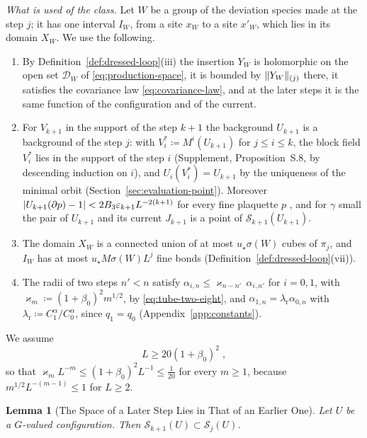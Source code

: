 \documentclass[11pt]{preprint}
\DeclarePairedDelimiter{\abs}{\lvert}{\rvert}
\DeclarePairedDelimiter{\norm}{\lVert}{\rVert}
\numberwithin{equation}{section}
\newtheorem{lemma}[theorem]{Lemma}
\theoremstyle{definition}
\theoremstyle{remark}
\theoremstyle{plain}
\begin{document}
\emph{What is used of the class.} Let $W$ be a group of the deviation species made at the step $j$; it has one interval $I_W$, from a site $x_W$ to a site $x'_W$, which lies in its domain $X_W$. We use the following.
\begin{enumerate}[label=(\alph*)]
\item By Definition~\ref{def:dressed-loop}(iii) the insertion $Y_W$ is holomorphic on the open set $\mathcal D_W$ of \eqref{eq:production-space}, it is bounded by $\norm{Y_W}_{(j)}$ there, it satisfies the covariance law \eqref{eq:covariance-law}, and at the later steps it is the same function of the configuration and of the current.
\item For $V_{k+1}$ in the support of the step $k + 1$ the background $U_{k+1}$ is a background of the step $j$: with $V^*_i \coloneqq M^i(U_{k+1})$ for $j \leq i \leq k$, the block field $V^*_i$ lies in the support of the step $i$ (Supplement, Proposition~S.8, by descending induction on $i$), and $U_i(V^*_i) = U_{k+1}$ by the uniqueness of the minimal orbit (Section~\ref{sec:evaluation-point}). Moreover $\abs{U_{k+1}(\partial p) - 1} < 2B_3\varepsilon_{k+1}L^{-2(k+1)}$ for every fine plaquette $p$ \cite[p.~268]{BalabanCRE}, and for $\gamma$ small the pair of $U_{k+1}$ and its current $J_{k+1}$ is a point of $\mathcal S_{k+1}(U_{k+1})$.
\item The domain $X_W$ is a connected union of at most $u_\star\sigma(W)$ cubes of $\pi_j$, and $I_W$ has at most $u_\star M\sigma(W)L^j$ fine bonds (Definition~\ref{def:dressed-loop}(vii)).
\item The radii of two steps $n' < n$ satisfy $\alpha_{i,n} \leq \varkappa_{n-n'}\,\alpha_{i,n'}$ for $i = 0, 1$, with $\varkappa_m \coloneqq (1 + \beta_0)^2m^{1/2}$, by \eqref{eq:tube-two-eight}, and $\alpha_{1,n} = \lambda_{\mathrm r}\alpha_{0,n}$ with $\lambda_{\mathrm r} \coloneqq C^\alpha_1/C^\alpha_0$, since $q_1 = q_0$ (Appendix~\ref{app:constants}).
\end{enumerate}
We assume
\begin{equation}\label{eq:carried-blocking-condition}
    L \geq 20(1 + \beta_0)^2\;,
\end{equation}
so that $\varkappa_mL^{-m} \leq (1 + \beta_0)^2L^{-1} \leq \frac{1}{20}$ for every $m \geq 1$, because $m^{1/2}L^{-(m-1)} \leq 1$ for $L \geq 2$.

\begin{lemma}[The Space of a Later Step Lies in That of an Earlier One]\label{lem:space-inclusion}
Let $U$ be a $G$-valued configuration. Then $\mathcal S_{k+1}(U) \subset \mathcal S_j(U)$.
\end{lemma}
\end{document}
